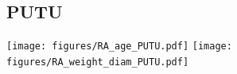 \documentclass[10pt]{book} %
\begin{document}
\clearpage
\newpage
\subsection{PUTU}
\texttt{[image: figures/RA\_age\_PUTU.pdf]}
\texttt{[image: figures/RA\_weight\_diam\_PUTU.pdf]}







\end{document}
